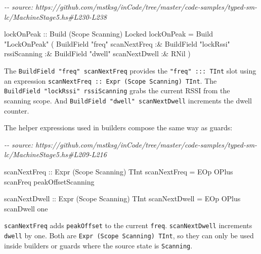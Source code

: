 \documentclass[]{article}
\newenvironment{Shaded}{}{}
\newcommand{\CommentTok}[1]{\textcolor[rgb]{0.38,0.63,0.69}{\textit{#1}}}
\newcommand{\DataTypeTok}[1]{\textcolor[rgb]{0.56,0.13,0.00}{#1}}
\newcommand{\NormalTok}[1]{#1}
\newcommand{\OperatorTok}[1]{\textcolor[rgb]{0.40,0.40,0.40}{#1}}
\newcommand{\OtherTok}[1]{\textcolor[rgb]{0.00,0.44,0.13}{#1}}
\newcommand{\StringTok}[1]{\textcolor[rgb]{0.25,0.44,0.63}{#1}}
\begin{document}
\begin{Shaded}
\begin{Highlighting}[]
\CommentTok{{-}{-} source: https://github.com/mstksg/inCode/tree/master/code{-}samples/typed{-}sm{-}lc/MachineStage5.hs\#L230{-}L238}

\OtherTok{lockOnPeak ::} \DataTypeTok{Build}\NormalTok{ (}\DataTypeTok{Scope} \DataTypeTok{Scanning}\NormalTok{) }\DataTypeTok{Locked}
\NormalTok{lockOnPeak }\OtherTok{=}
  \DataTypeTok{Build}
    \StringTok{"LockOnPeak"}
\NormalTok{    ( }\DataTypeTok{BuildField} \StringTok{"freq"}\NormalTok{ scanNextFreq}
        \OperatorTok{:\&} \DataTypeTok{BuildField} \StringTok{"lockRssi"}\NormalTok{ rssiScanning}
        \OperatorTok{:\&} \DataTypeTok{BuildField} \StringTok{"dwell"}\NormalTok{ scanNextDwell}
        \OperatorTok{:\&} \DataTypeTok{RNil}
\NormalTok{    )}
\end{Highlighting}
\end{Shaded}

The \texttt{BuildField\ "freq"\ scanNextFreq} provides the
\texttt{"freq"\ :::\ TInt} slot using an expression
\texttt{scanNextFreq\ ::\ Expr\ (Scope\ Scanning)\ TInt}. The
\texttt{BuildField\ "lockRssi"\ rssiScanning} grabs the current RSSI from the
scanning scope. And \texttt{BuildField\ "dwell"\ scanNextDwell} increments the
dwell counter.

The helper expressions used in builders compose the same way as guards:

\begin{Shaded}
\begin{Highlighting}[]
\CommentTok{{-}{-} source: https://github.com/mstksg/inCode/tree/master/code{-}samples/typed{-}sm{-}lc/MachineStage5.hs\#L209{-}L216}

\OtherTok{scanNextFreq ::} \DataTypeTok{Expr}\NormalTok{ (}\DataTypeTok{Scope} \DataTypeTok{Scanning}\NormalTok{) }\DataTypeTok{TInt}
\NormalTok{scanNextFreq }\OtherTok{=} \DataTypeTok{EOp} \DataTypeTok{OPlus}\NormalTok{ scanFreq peakOffsetScanning}

\OtherTok{scanNextDwell ::} \DataTypeTok{Expr}\NormalTok{ (}\DataTypeTok{Scope} \DataTypeTok{Scanning}\NormalTok{) }\DataTypeTok{TInt}
\NormalTok{scanNextDwell }\OtherTok{=} \DataTypeTok{EOp} \DataTypeTok{OPlus}\NormalTok{ scanDwell one}
\end{Highlighting}
\end{Shaded}

\texttt{scanNextFreq} adds \texttt{peakOffset} to the current \texttt{freq}.
\texttt{scanNextDwell} increments \texttt{dwell} by one. Both are
\texttt{Expr\ (Scope\ Scanning)\ TInt}, so they can only be used inside builders
or guards where the source state is \texttt{Scanning}.
\end{document}
